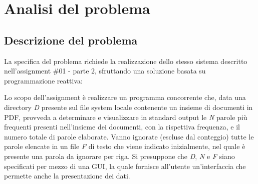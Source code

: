 \section{Analisi del problema}
\subsection{Descrizione del problema}
La specifica del problema richiede la realizzazione dello stesso sistema  descritto nell'assignment \#01 - parte 2, sfruttando una soluzione basata su programmazione reattiva: \newline

\noindent Lo scopo dell'assignment è realizzare un programma concorrente che, data una directory \textit{D} presente sul file system locale contenente un insieme di documenti in PDF, provveda a determinare e visualizzare in standard output le \textit{N} parole più frequenti presenti nell’insieme dei documenti, con la rispettiva frequenza, e il numero totale di parole elaborate.\newline
Vanno ignorate (escluse dal conteggio) tutte le parole elencate in un file \textit{F} di testo che viene indicato inizialmente, nel quale è presente una parola da ignorare per riga.\newline
Si presuppone che \textit{D}, \textit{N} e \textit{F} siano specificati per mezzo di una GUI, la quale fornisce all'utente un'interfaccia che permette anche la presentazione dei dati.
